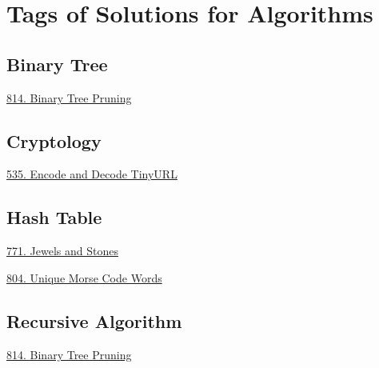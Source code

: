 \tocless\section{Tags of Solutions for Algorithms}
\label{sec:algo_tag}

\subsection*{Binary Tree}
\begin{flushleft}
    \hyperref[algo:814]{814. Binary Tree Pruning}
\end{flushleft}

\subsection*{Cryptology}
\begin{flushleft}
    \hyperref[algo:535]{535. Encode and Decode TinyURL}
\end{flushleft}

\subsection*{Hash Table}
\begin{flushleft}
    \hyperref[algo:771]{771. Jewels and Stones}
    
    \hyperref[algo:804]{804. Unique Morse Code Words}
\end{flushleft}

\subsection*{Recursive Algorithm}
\begin{flushleft}
    \hyperref[algo:814]{814. Binary Tree Pruning}
\end{flushleft}
